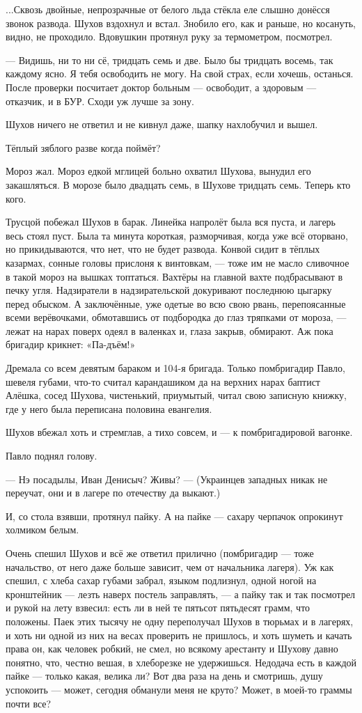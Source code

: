 ...Сквозь двойные, непрозрачные от белого льда стёкла еле слышно донёсся звонок развода.
Шухов вздохнул и встал. Знобило его, как и раньше, но косануть, видно, не проходило. Вдовушкин
протянул руку за термометром, посмотрел.

--- Видишь, ни то ни сё, тридцать семь и две. Было бы тридцать восемь, так каждому ясно. Я тебя
освободить не могу. На свой страх, если хочешь, останься. После проверки посчитает доктор
больным --- освободит, а здоровым --- отказчик, и в БУР. Сходи уж лучше за зону.

Шухов ничего не ответил и не кивнул даже, шапку нахлобучил и вышел.

Тёплый зяблого разве когда поймёт?

Мороз жал. Мороз едкой мглицей больно охватил Шухова, вынудил его закашляться. В морозе было
двадцать семь, в Шухове тридцать семь. Теперь кто кого.

Трусцой побежал Шухов в барак. Линейка напролёт была вся пуста, и лагерь весь стоял пуст.
Была та минута короткая, разморчивая, когда уже всё оторвано, но прикидываются, что нет, что
не будет развода. Конвой сидит в тёплых казармах, сонные головы прислоня к винтовкам, --- тоже
им не масло сливочное в такой мороз на вышках топтаться. Вахтёры на главной вахте
подбрасывают в печку угля. Надзиратели в надзирательской докуривают последнюю цыгарку
перед обыском. А заключённые, уже одетые во всю свою рвань, перепоясанные всеми верёвочками,
обмотавшись от подбородка до глаз тряпками от мороза, --- лежат на нарах поверх одеял в
валенках и, глаза закрыв, обмирают. Аж пока бригадир крикнет: «Па-дъём!»

Дремала со всем девятым бараком и 104-я бригада. Только помбригадир Павло, шевеля губами,
что-то считал карандашиком да на верхних нарах баптист Алёшка, сосед Шухова, чистенький,
приумытый, читал свою записную книжку, где у него была переписана половина евангелия.

Шухов вбежал хоть и стремглав, а тихо совсем, и --- к помбригадировой вагонке.

Павло поднял голову.

--- Нэ посадылы, Иван Денисыч? Живы? --- (Украинцев западных никак не переучат, они и в лагере по
отечеству да выкают.)

И, со стола взявши, протянул пайку. А на пайке --- сахару черпачок опрокинут холмиком белым.

Очень спешил Шухов и всё же ответил прилично (помбригадир --- тоже начальство, от него даже
больше зависит, чем от начальника лагеря). Уж как спешил, с хлеба сахар губами забрал, языком
подлизнул, одной ногой на кронштейник --- лезть наверх постель заправлять, --- а пайку так и так
посмотрел и рукой на лету взвесил: есть ли в ней те пятьсот пятьдесят грамм, что положены.
Паек этих тысячу не одну переполучал Шухов в тюрьмах и в лагерях, и хоть ни одной из них на
весах проверить не пришлось, и хоть шуметь и качать права он, как человек робкий, не смел, но
всякому арестанту и Шухову давно понятно, что, честно вешая, в хлеборезке не удержишься.
Недодача есть в каждой пайке --- только какая, велика ли? Вот два раза на день и смотришь, душу
успокоить --- может, сегодня обманули меня не круто? Может, в моей-то граммы почти все?

